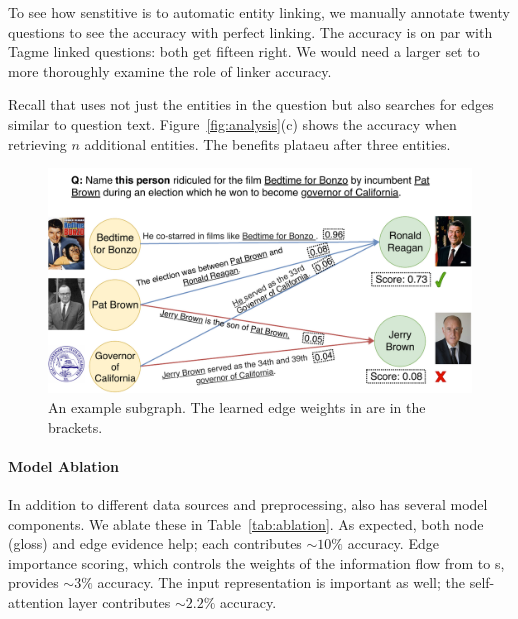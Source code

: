 To see how senstitive \name{} is to automatic entity linking, we
manually annotate twenty questions to see the accuracy with perfect
linking.
%
The accuracy is on par with Tagme linked questions: both get fifteen
right.
%
We would need a larger set to more thoroughly examine the role of
linker accuracy.

Recall that \name{} uses not just the entities in the question but
also searches for edges similar to question text.
%
Figure~\ref{fig:analysis}(c) shows the accuracy when retrieving $n$ additional entities.
%
The benefits plataeu after three entities.





\begin{figure}[t]
      \begin{center}
      \includegraphics[width=0.9\linewidth]{2020_www_delft/figures/graph_vis_2020.pdf}
      \end{center}
      \caption{An example \name{} subgraph. The learned edge weights in  are in the brackets. }
      \label{fig:graphvis}
\end{figure}



\paragraph{Model Ablation}

In addition to different data sources and preprocessing, \name{}
also has several model components.
%
We ablate these in Table~\ref{tab:ablation}.
%
As expected, both node (gloss) and edge evidence 
help; each contributes $\sim 10\%$ accuracy.
%
Edge importance scoring, which controls the weights of the information
flow from \leftnode{} to \rightnode{}s, provides $\sim 3\%$
accuracy.
%
The input representation is important as well; the self-attention
layer contributes $\sim 2.2\%$ accuracy.





